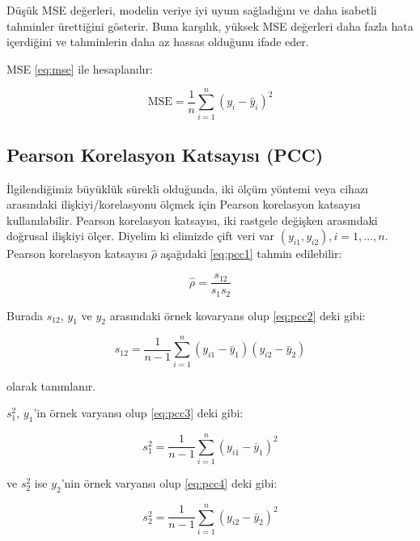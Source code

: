 Düşük MSE değerleri, modelin veriye iyi uyum sağladığını ve daha isabetli tahminler ürettiğini gösterir. Buna karşılık, yüksek MSE değerleri daha fazla hata içerdiğini ve tahminlerin daha az hassas olduğunu ifade eder.

MSE \eqref{eq:mse} ile hesaplanılır:


\begin{equation}
    \text{MSE} = { \frac{1}{n} \sum_{i=1}^{n} (y_i - \hat{y}_i)^2 }
    \label{eq:mse}
\end{equation}
 
\subsection{Pearson Korelasyon Katsayısı (PCC)}

İlgilendiğimiz büyüklük sürekli olduğunda, iki ölçüm yöntemi veya cihazı arasındaki ilişkiyi/korelasyonu ölçmek için Pearson korelasyon katsayısı kullanılabilir. Pearson korelasyon katsayısı, iki rastgele değişken arasındaki doğrusal ilişkiyi ölçer. Diyelim ki elimizde çift veri var \(\left( y_{i1}, y_{i2} \right), i = 1, \ldots, n\). Pearson korelasyon katsayısı \(\hat{\rho}\) aşağıdaki \eqref{eq:pcc1} tahmin edilebilir:

\begin{equation}
    \hat{\rho} = \frac{s_{12}}{s_{1} s_{2}}
    \label{eq:pcc1}
\end{equation}

Burada \(s_{12}\), \(y_{1}\) ve \(y_{2}\) arasındaki örnek kovaryans olup \eqref{eq:pcc2} deki gibi:

\begin{equation}
    s_{12} = \frac{1}{n-1} \sum_{i=1}^{n} \left( y_{i1} - \bar{y}_{1} \right) \left( y_{i2} - \bar{y}_{2} \right)
    \label{eq:pcc2}
\end{equation}

olarak tanımlanır.

\(s_{1}^{2}\), \(y_{1}\)’in örnek varyansı olup \eqref{eq:pcc3} deki gibi:

\begin{equation}
    s_{1}^{2} = \frac{1}{n-1} \sum_{i=1}^{n} \left( y_{i1} - \bar{y}_{1} \right)^{2}
    \label{eq:pcc3}
\end{equation}


ve \(s_{2}^{2}\) ise \(y_{2}\)’nin örnek varyansı olup \eqref{eq:pcc4} deki gibi:

\begin{equation}
    s_{2}^{2} = \frac{1}{n-1} \sum_{i=1}^{n} \left( y_{i2} - \bar{y}_{2} \right)^{2}
    \label{eq:pcc4}
\end{equation}

